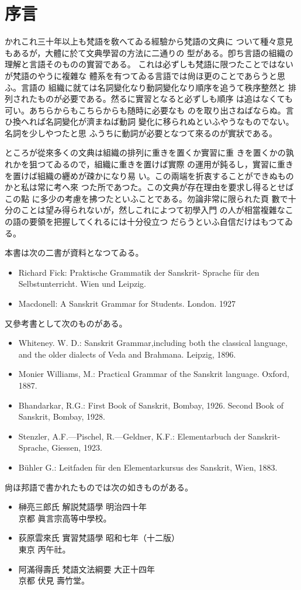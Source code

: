 \chapter*{序言}
\label{cha:preface}
かれこれ三十年以上も梵語を敎へてゐる經驗から梵語の文典に
ついて種々意見もあるが，大體に於て文典學習の方法に二通りの
型がある。卽ち言語の組織の理解と言語そのものの實習である。
これは必ずしも梵語に限つたことではないが梵語のやうに複雜な
體系を有つてゐる言語では尙ほ更のことであらうと思ふ。言語の
組織に就ては名詞變化なり動詞變化なり順序を追うて秩序整然と
排列されたものが必要である。然るに實習となると必ずしも順序
は追はなくても可い。あちらからもこちらからも随時に必要なも
のを取り出さねばならぬ。言ひ換へれば名詞變化が濟まねば動詞
變化に移られぬといふやうなものでない。名詞を少しやつたと思
ふうちに動詞が必要となつて來るのが實狀である。

ところが從來多くの文典は組織の排列に重きを置くか實習に重
きを置くかの孰れかを狙つてゐるので，組織に重きを置けば實際
の運用が鈍るし，實習に重きを置けば組織の纒めが疎かになり易
い。この兩端を折衷することができぬものかと私は常に考へ來
つた所であつた。この文典が存在理由を要求し得るとせばこの點
に多少の考慮を拂つたといふことである。勿論非常に限られた頁
數で十分のことは望み得られないが，然しこれによつて初學入門
の人が相當複雜なこの語の要領を把握してくれるには十分役立つ
だらうといふ自信だけはもつてゐる。

本書は次の二書が資料となつてゐる。
\begin{itemize}
\item Richard Fick: Praktische Grammatik der Sanskrit-
Sprache für den Selbstunterricht. Wien und Leipzig.
\item Macdonell: A Sanskrit Grammar for Students. London. 1927
\end{itemize}

又參考書として次のものがある。
\begin{itemize}
\item Whiteney. W. D.: Sanskrit Grammar,including both the
classical language, and the older dialects of Veda and Brahmana. Leipzig, 1896.
\item Monier Williams, M.: Practical Grammar of the San\-skrit language. Oxford, 1887.
\item Bhandarkar, R.G.: First Book of Sanskrit, Bombay, 1926. Second Book of Sanskrit, Bombay, 1928.
\item Stenzler, A.F.---Pischel, R.---Geldner, K.F.: Elementar\-buch der Sanskrit-Sprache, Giessen, 1923.
\item Bühler G.: Leitfaden für den Elementarkursus des Sanskrit, Wien, 1883.
\end{itemize}

尙ほ邦語で書かれたものでは次の如きものがある。
\begin{itemize}
\item 榊亮三郎氏 解説梵語學 明治四十年\\
\hfil 京都 眞言宗高等中學校。
\item 荻原雲來氏 實習梵語學 昭和七年（十二版）\\
\hfil 東京 丙午社。
\item 阿滿得壽氏 梵語文法綱要 大正十四年\\
\hfil 京都 伏見 壽竹堂。
\end{itemize}

